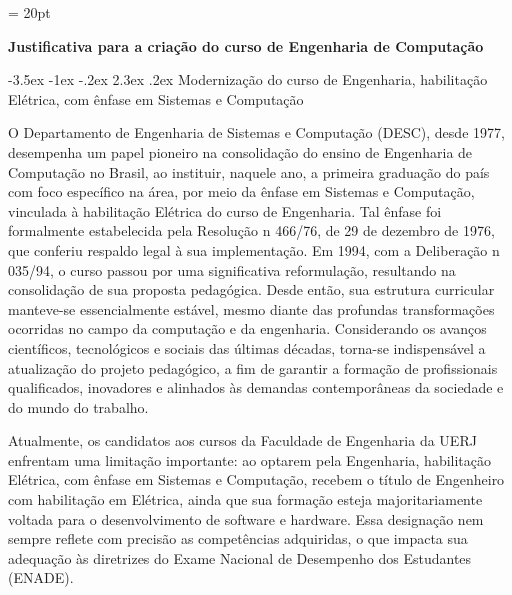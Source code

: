 \documentclass[12pt,a4paper]{article}
\makeatletter
\renewcommand{\section}{\@startsection{section}{1}{\z@}%
      {-3.5ex \@plus -1ex \@minus -.2ex}%
      {2.3ex \@plus.2ex}%
      {\normalfont\normalsize\bfseries}}
\newcommand{\cursoatual}{Engenharia, habilitação Elétrica, com ênfase em Sistemas e Computação\xspace}
\makeatother
\begin{document}
\thispagestyle{firstpage} %
\headsep = 20pt
\setlength{\tabcolsep}{5pt} %
\vspace*{2.0cm}

\pagestyle{plain} %

\begin{center}
  \textbf{\large Justificativa para a criação do curso de Engenharia de Computação} \\
\end{center}
\small
\section{Modernização do curso de \cursoatual}

O Departamento de Engenharia de Sistemas e Computação (DESC), desde 1977, desempenha um papel pioneiro na consolidação do ensino de Engenharia de Computação no Brasil, ao instituir, naquele ano, a primeira graduação do país com foco específico na área, por meio da ênfase em Sistemas e Computação, vinculada à habilitação Elétrica do curso de Engenharia. Tal ênfase foi formalmente estabelecida pela Resolução n\textordmasculine{} 466/76, de 29 de dezembro de 1976, que conferiu respaldo legal à sua implementação. Em 1994, com a Deliberação n\textordmasculine{} 035/94, o curso passou por uma significativa reformulação, resultando na consolidação de sua proposta pedagógica. Desde então, sua estrutura curricular manteve-se essencialmente estável, mesmo diante das profundas transformações ocorridas no campo da computação e da engenharia. Considerando os avanços científicos, tecnológicos e sociais das últimas décadas, torna-se indispensável a atualização do projeto pedagógico, a fim de garantir a formação de profissionais qualificados, inovadores e alinhados às demandas contemporâneas da sociedade e do mundo do trabalho.

Atualmente, os candidatos aos cursos da Faculdade de Engenharia da UERJ enfrentam uma limitação importante: ao optarem pela \cursoatual, recebem o título de Engenheiro com habilitação em Elétrica, ainda que sua formação esteja majoritariamente voltada para o desenvolvimento de software e hardware. Essa designação nem sempre reflete com precisão as competências adquiridas, o que impacta sua adequação às diretrizes do Exame Nacional de Desempenho dos Estudantes (ENADE).
\end{document}
